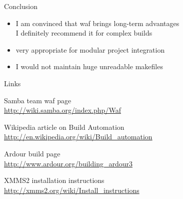 \documentclass[xetex]{beamer}
\begin{document}
\begin{frame}{Conclusion}
	\begin{itemize}
		\item I am convinced that waf brings long-term advantages\\
		I definitely recommend it for complex builds
		\item very appropriate for modular project integration
		\item I would not maintain huge unreadable makefiles
	\end{itemize}
\end{frame}

\begin{frame}{Links}

\begin{thebibliography}{9}

 Samba team waf page\\
\url{http://wiki.samba.org/index.php/Waf}

 Wikipedia article on Build Automation\\
\url{http://en.wikipedia.org/wiki/Build_automation}

 Ardour build page\\
\url{http://www.ardour.org/building_ardour3}

 XMMS2 installation instructions\\
\url{http://xmms2.org/wiki/Install_instructions}

\end{thebibliography}

\end{frame}
\end{document}
